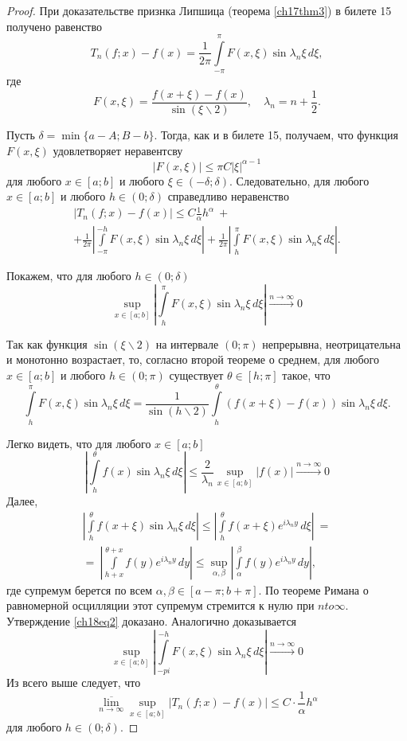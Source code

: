 \begin{proof}
При доказательстве признка Липшица (теорема \ref{ch17thm3}) в билете 15 получено равенство
$$
T_n(f; x) - f(x) = \frac{1}{2\pi} \int\limits_{-\pi}^{\pi} F(x,\xi) \sin{\lambda_n \xi} \,d\xi,
$$
где
$$
F(x,\xi) = \frac{f(x+\xi) - f(x)}{\sin (\xi \backslash 2)}, \quad \lambda_{n} = n + \frac12.
$$

Пусть $\delta = \min \{a - A;B - b\}$. Тогда, как и в билете 15, получаем, что функция $F(x,\xi)$ удовлетворяет неравентсву
$$
|F(x,\xi)| \le \pi C |\xi|^{\alpha - 1}
$$
для любого $x \in [a;b]$ и любого $\xi \in (-\delta;\delta)$. Следовательно, для любого $x \in [a;b]$ и любого $h \in (0;\delta)$ справедливо неравенство
\begin{multline} \label{ch18eq1}
|T_n(f; x) - f(x)| \le C \frac{1}{\alpha} h^{\alpha}\ +\\
+ \frac{1}{2\pi} \left| \int\limits_{-\pi}^{-h} F(x,\xi) \sin{\lambda_n \xi} \,d\xi \right| + \frac{1}{2\pi} \left| \int\limits_{h}^{\pi} F(x,\xi) \sin{\lambda_n \xi} \,d\xi \right|.
\end{multline}

Покажем, что для любого $h \in (0;\delta)$
\begin{equation} \label{ch18eq2}
\sup\limits_{x \in [a;b]}\left|\int\limits_{h}^{\pi} F(x,\xi) \sin{\lambda_n \xi} \,d\xi \right| \xrightarrow{n \to \infty} 0
\end{equation}

Так как функция $\sin (\xi \backslash 2)$ на интервале $(0;\pi)$ непрерывна, неотрицательна и монотонно возрастает, то, согласно второй теореме о среднем, для любого $x \in [a;b]$ и любого $h \in (0;\pi)$ существует $\theta \in [h;\pi]$ такое, что
$$
\int\limits_{h}^{\pi} F(x,\xi) \sin{\lambda_n \xi}\,d\xi = \frac{1}{\sin (h \backslash 2)} \int\limits_{h}^{\theta} (f(x+\xi) - f(x)) \sin{\lambda_n \xi}\,d\xi.
$$

Легко видеть, что для любого $x \in [a;b]$
$$
\left| \int\limits_{h}^{\theta} f(x) \sin{\lambda_n \xi}\,d\xi \right| \le \frac{2}{\lambda_{n}}\sup\limits_{x \in [a;b]}|f(x)| \xrightarrow{n \to \infty} 0
$$
Далее,
\begin{multline*}
\left| \int\limits_{h}^{\theta} f(x + \xi) \sin{\lambda_n \xi}\,d\xi \right| \le \left| \int\limits_{h}^{\theta} f(x + \xi) e^{i\lambda_{n}y} \,d\xi \right|\ =\\
=\ \left| \int\limits_{h + x}^{\theta + x} f(y) e^{i\lambda_{n}y}\,dy \right| \le \sup\limits_{\alpha,\beta} \left|\int\limits_{\alpha}^{\beta} f(y) e^{i\lambda_{n}y}\,dy \right|,
\end{multline*}
где супремум берется по всем $\alpha,\beta \in [a - \pi;b + \pi]$. По теореме Римана о равномерной осцилляции этот супремум стремится к нулю при $n to \infty$. Утверждение \eqref{ch18eq2} доказано. Аналогично доказывается
\begin{equation} \label{ch18eq3}
\sup\limits_{x \in [a;b]} \left|\int\limits_{-pi}^{-h} F(x,\xi) \sin{\lambda_n \xi} \,d\xi \right| \xrightarrow{n \to \infty} 0
\end{equation}
Из всего выше следует, что
$$
\overline{\lim\limits_{n \to \infty}} \sup \limits_{x \in [a;b]} |T_n(f; x) - f(x)| \le C \cdot \frac{1}{\alpha}h^{\alpha}
$$
для любого $h \in (0;\delta)$.
\end{proof}
